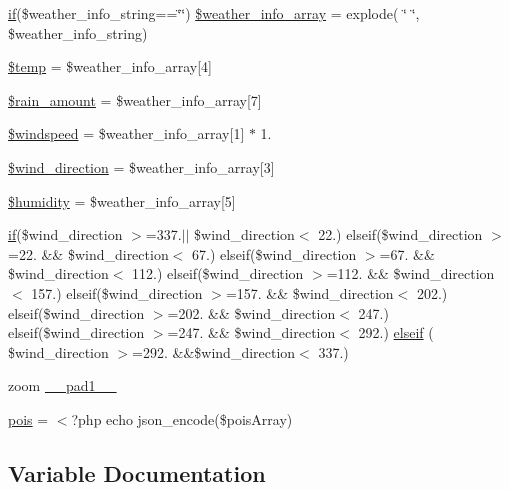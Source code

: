 \begin{DoxyCompactItemize}
\item 
\mbox{\hyperlink{hull_2index_8php_a8f0d8893361d6307986497540738a8bf}{if}}(\$weather\+\_\+info\+\_\+string==\char`\"{}\char`\"{}) \mbox{\hyperlink{hull_2index_8php_a16271cc4158d1822fa59adaf196eb3d4}{\$weather\+\_\+info\+\_\+array}} = explode( \char`\"{} \char`\"{}, \$weather\+\_\+info\+\_\+string)
\item 
\mbox{\hyperlink{hull_2index_8php_a0d57fb0317e19ec798aa625381ebf342}{\$temp}} = \$weather\+\_\+info\+\_\+array\mbox{[}4\mbox{]}
\item 
\mbox{\hyperlink{hull_2index_8php_a2aa7fd45b683a3c60b6f5e5d11a027b3}{\$rain\+\_\+amount}} = \$weather\+\_\+info\+\_\+array\mbox{[}7\mbox{]}
\item 
\mbox{\hyperlink{hull_2index_8php_a98bffc039f434ba80b316614e0fc94db}{\$windspeed}} = \$weather\+\_\+info\+\_\+array\mbox{[}1\mbox{]} $\ast$ 1.
\item 
\mbox{\hyperlink{hull_2index_8php_acae9d7e1905e3a01e07d87856885aa2c}{\$wind\+\_\+direction}} = \$weather\+\_\+info\+\_\+array\mbox{[}3\mbox{]}
\item 
\mbox{\hyperlink{hull_2index_8php_aff5636a5f8216e0c22399f0c2d78a80d}{\$humidity}} = \$weather\+\_\+info\+\_\+array\mbox{[}5\mbox{]}
\item 
\mbox{\hyperlink{hull_2index_8php_a8f0d8893361d6307986497540738a8bf}{if}}(\$wind\+\_\+direction $>$=337.$\vert$$\vert$ \$wind\+\_\+direction$<$ 22.) elseif(\$wind\+\_\+direction $>$=22. \&\& \$wind\+\_\+direction$<$ 67.) elseif(\$wind\+\_\+direction $>$=67. \&\& \$wind\+\_\+direction$<$ 112.) elseif(\$wind\+\_\+direction $>$=112. \&\& \$wind\+\_\+direction$<$ 157.) elseif(\$wind\+\_\+direction $>$=157. \&\& \$wind\+\_\+direction$<$ 202.) elseif(\$wind\+\_\+direction $>$=202. \&\& \$wind\+\_\+direction$<$ 247.) elseif(\$wind\+\_\+direction $>$=247. \&\& \$wind\+\_\+direction$<$ 292.) \mbox{\hyperlink{hull_2index_8php_aa8f062d2792cb6f2003b5743776f492a}{elseif}} ( \$wind\+\_\+direction $>$=292. \&\&\$wind\+\_\+direction$<$ 337.)
\item 
zoom \mbox{\hyperlink{hull_2index_8php_a6a6b44b803abb014544190586597431f}{\+\_\+\+\_\+pad1\+\_\+\+\_\+}}
\item 
\mbox{\hyperlink{hull_2index_8php_a6a514fba2a6c59dcbdb65a73e7c76f73}{pois}} = $<$?php echo json\+\_\+encode(\$pois\+Array)
\end{DoxyCompactItemize}


\subsection{Variable Documentation}
\mbox{\label{hull_2index_8php_a460a08379d150f8c151a07ad9a3251cd}} 
